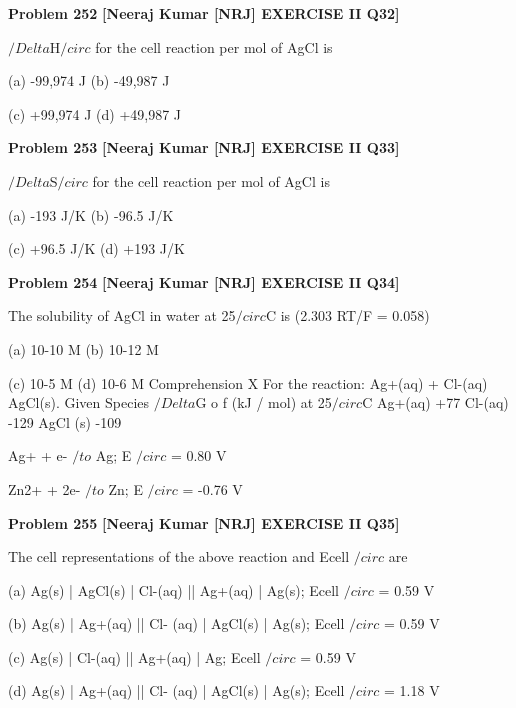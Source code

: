 \begin{problembox}
\textbf{Problem 252} \hfill \textbf{[Neeraj Kumar [NRJ] EXERCISE II Q32]}
\label{q:ext-nrj_all_questions-252}

$/Delta$H$/circ$ for the cell reaction per mol of AgCl is
 
 (a) -99,974 J 
(b) -49,987 J
 
 (c) +99,974 J 
(d) +49,987 J
\end{problembox}

\begin{problembox}
\textbf{Problem 253} \hfill \textbf{[Neeraj Kumar [NRJ] EXERCISE II Q33]}
\label{q:ext-nrj_all_questions-253}

$/Delta$S$/circ$ for the cell reaction per mol of AgCl is
 
 (a) -193 J/K 
(b) -96.5 J/K
 
 (c) +96.5 J/K 
(d) +193 J/K
\end{problembox}

\begin{problembox}
\textbf{Problem 254} \hfill \textbf{[Neeraj Kumar [NRJ] EXERCISE II Q34]}
\label{q:ext-nrj_all_questions-254}

The solubility of AgCl in water at 25$/circ$C is (2.303 
RT/F = 0.058)
 
 (a) 10-10 M 
(b) 10-12 M
 
 (c) 10-5 M 
(d) 10-6 M
Comprehension X
For the reaction: Ag+(aq) + Cl-(aq)   AgCl(s). Given
Species
$/Delta$G o
f (kJ / mol) at 25$/circ$C
Ag+(aq)
+77
Cl-(aq)
-129
AgCl (s)
-109
 
 Ag+ + e- $/to$ Ag; E $/circ$ = 0.80 V
 
 Zn2+ + 2e- $/to$ Zn; E $/circ$ = -0.76 V
\end{problembox}

\begin{problembox}
\textbf{Problem 255} \hfill \textbf{[Neeraj Kumar [NRJ] EXERCISE II Q35]}
\label{q:ext-nrj_all_questions-255}

The cell representations of the above reaction and 
Ecell
$/circ$ are
 
 (a)  Ag(s) | AgCl(s) | Cl-(aq) || Ag+(aq) | Ag(s); 
Ecell
$/circ$ = 0.59 V
 
 (b)  Ag(s) | Ag+(aq) || Cl- (aq) | AgCl(s) | Ag(s); 
Ecell
$/circ$ = 0.59 V
 
 (c)  Ag(s) | Cl-(aq) || Ag+(aq) | Ag; Ecell
$/circ$ = 0.59 V
 
 (d)  Ag(s) | Ag+(aq) || Cl- (aq) | AgCl(s) | Ag(s); 
Ecell
$/circ$ = 1.18 V
\end{problembox}

